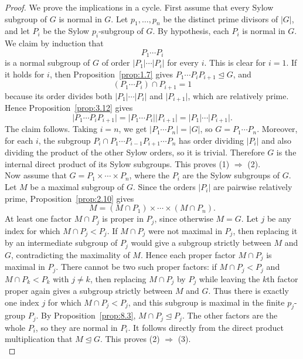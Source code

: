 \documentclass[../Odyssey_Project.tex]{subfiles}
\begin{document}
\begin{proof}
We prove the implications in a cycle. First assume that every Sylow subgroup of $G$ is normal in $G$. Let $p_1,\ldots,p_n$ be the distinct prime divisors of $\lvert G\rvert$, and let $P_i$ be the Sylow $p_i$-subgroup of $G$. By hypothesis, each $P_i$ is normal in $G$. We claim by induction that
\[
    P_1\cdots P_i
\]
is a normal subgroup of $G$ of order $\lvert P_1\rvert\cdots\lvert P_i\rvert$ for every $i$. This is clear for $i=1$. If it holds for $i$, then Proposition~\ref{prop:1.7} gives $P_1\cdots P_iP_{i+1}\trianglelefteq G$, and
\[
    (P_1\cdots P_i)\cap P_{i+1}=1
\]
because its order divides both $\lvert P_1\rvert\cdots\lvert P_i\rvert$ and $\lvert P_{i+1}\rvert$, which are relatively prime. Hence Proposition~\ref{prop:3.12} gives
\[
    \lvert P_1\cdots P_iP_{i+1}\rvert
    =\lvert P_1\cdots P_i\rvert\lvert P_{i+1}\rvert
    =\lvert P_1\rvert\cdots\lvert P_{i+1}\rvert.
\]
The claim follows. Taking $i=n$, we get $\lvert P_1\cdots P_n\rvert=\lvert G\rvert$, so $G=P_1\cdots P_n$. Moreover, for each $i$, the subgroup $P_i\cap P_1\cdots P_{i-1}P_{i+1}\cdots P_n$ has order dividing $\lvert P_i\rvert$ and also dividing the product of the other Sylow orders, so it is trivial. Therefore $G$ is the internal direct product of its Sylow subgroups. This proves (1) $\Rightarrow$ (2).\\
Now assume that $G=P_1\times\cdots\times P_n$, where the $P_i$ are the Sylow subgroups of $G$. Let $M$ be a maximal subgroup of $G$. Since the orders $\lvert P_i\rvert$ are pairwise relatively prime, Proposition~\ref{prop:2.10} gives
\[
    M=(M\cap P_1)\times\cdots\times(M\cap P_n).
\]
At least one factor $M\cap P_j$ is proper in $P_j$, since otherwise $M=G$. Let $j$ be any index for which $M\cap P_j<P_j$. If $M\cap P_j$ were not maximal in $P_j$, then replacing it by an intermediate subgroup of $P_j$ would give a subgroup strictly between $M$ and $G$, contradicting the maximality of $M$. Hence each proper factor $M\cap P_j$ is maximal in $P_j$. There cannot be two such proper factors: if $M\cap P_j<P_j$ and $M\cap P_k<P_k$ with $j\neq k$, then replacing $M\cap P_j$ by $P_j$ while leaving the $k$th factor proper again gives a subgroup strictly between $M$ and $G$. Thus there is exactly one index $j$ for which $M\cap P_j<P_j$, and this subgroup is maximal in the finite $p_j$-group $P_j$. By Proposition~\ref{prop:8.3}, $M\cap P_j\trianglelefteq P_j$. The other factors are the whole $P_i$, so they are normal in $P_i$. It follows directly from the direct product multiplication that $M\trianglelefteq G$. This proves (2) $\Rightarrow$ (3).\\

\end{proof}
\end{document}
